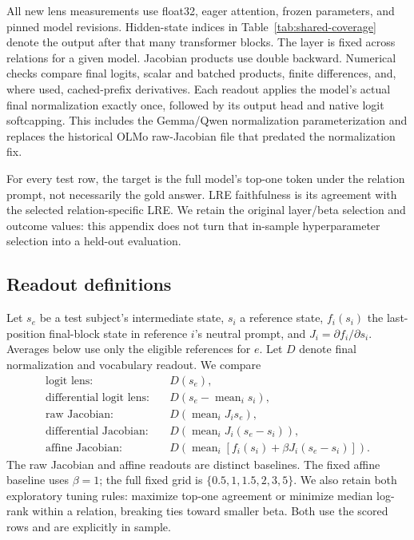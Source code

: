 All new lens measurements use float32, eager attention, frozen parameters,
and pinned model revisions. Hidden-state indices in
Table~\ref{tab:shared-coverage} denote the output after that many transformer
blocks. The layer is fixed across relations for a given model.
Jacobian products use double backward. Numerical checks compare final
logits, scalar and batched products, finite differences, and, where used,
cached-prefix derivatives. Each readout applies the model's actual final
normalization exactly once, followed by its output head and native logit
softcapping. This includes the Gemma/Qwen normalization parameterization and
replaces the historical OLMo raw-Jacobian file that predated the normalization fix.

For every test row, the target is the full model's top-one token under the
relation prompt, not necessarily the gold answer. LRE faithfulness is its
agreement with the selected relation-specific LRE. We retain the original
layer/beta selection and outcome values: this appendix does not turn that
in-sample hyperparameter selection into a held-out evaluation.



\subsection{Readout definitions}

Let $s_e$ be a test subject's intermediate state, $s_i$ a reference state,
$f_i(s_i)$ the last-position final-block state in reference $i$'s neutral
prompt, and $J_i=\partial f_i/\partial s_i$. Averages below use only the
eligible references for $e$. Let $D$ denote final normalization and vocabulary
readout. We compare
\begin{align*}
 \text{logit lens:}\quad &D(s_e),\\
 \text{differential logit lens:}\quad &D(s_e-\operatorname{mean}_i s_i),\\
 \text{raw Jacobian:}\quad &D(\operatorname{mean}_i J_i s_e),\\
 \text{differential Jacobian:}\quad &D(\operatorname{mean}_i J_i(s_e-s_i)),\\
 \text{affine Jacobian:}\quad
 &D\!\left(\operatorname{mean}_i[f_i(s_i)+\beta J_i(s_e-s_i)]\right).
\end{align*}
The raw Jacobian and affine readouts are distinct baselines. The fixed affine
baseline uses $\beta=1$; the full fixed grid is
$\{0.5,1,1.5,2,3,5\}$. We also retain both exploratory tuning rules: maximize
top-one agreement or minimize median log-rank within a relation, breaking
ties toward smaller beta. Both use the scored rows and are explicitly
in sample.

